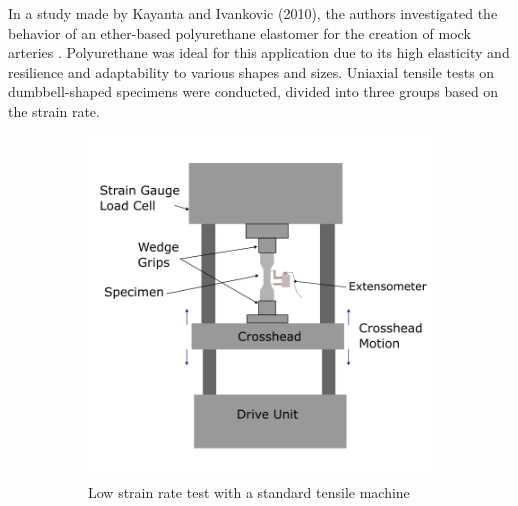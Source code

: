 In a study made by Kayanta and Ivankovic (2010), the authors investigated the behavior of an ether-based polyurethane 
elastomer for the creation of mock arteries \cite{Kanyanta2010}. Polyurethane was ideal for this application due to 
its high elasticity and resilience and adaptability to various shapes and sizes. Uniaxial tensile tests on 
dumbbell-shaped specimens were conducted, divided into three groups based on the strain rate.

\begin{figure}
        \centering
    
        \begin{subfigure}[b]{0.45\textwidth}
        \centering
        \includegraphics[width=\textwidth]{Images/chapter1/uniaxialtension.png}
        \caption{Low strain rate test with a standard tensile machine}
        \label{fig:subfiglow}
        \end{subfigure}
        \hfill
        \begin{subfigure}[b]{0.45\textwidth}
        \centering

\end{subfigure}
\end{figure}
